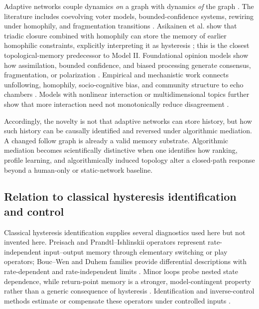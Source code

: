 \documentclass[10pt,a4paper]{article}
\begin{document}
Adaptive networks couple dynamics \emph{on} a graph with dynamics \emph{of} the graph \cite{gross2008adaptive}. The literature includes coevolving voter models, bounded-confidence systems, rewiring under homophily, and fragmentation transitions \cite{holme2006nonequilibrium,kozma2008consensus,gil2006coevolution,vazquez2008adaptive,kan2023adaptive,li2025adaptive}. Asikainen et al. show that triadic closure combined with homophily can store the memory of earlier homophilic constraints, explicitly interpreting it as hysteresis \cite{asikainen2020cumulative}; this is the closest topological-memory predecessor to Model II. Foundational opinion models show how assimilation, bounded confidence, and biased processing generate consensus, fragmentation, or polarization \cite{deffuant2000mixing,castellano2009statistical,dandekar2013assimilation}. Empirical and mechanistic work connects unfollowing, homophily, socio-cognitive bias, and community structure to echo chambers \cite{sasahara2021unfollowing,wang2020public,cinelli2021echo}. Models with nonlinear interaction or multidimensional topics further show that more interaction need not monotonically reduce disagreement \cite{baumann2020echo,baumann2021topics,thurner2025interactions}.

Accordingly, the novelty is not that adaptive networks can store history, but how such history can be causally identified and reversed under algorithmic mediation. A changed follow graph is already a valid memory substrate. Algorithmic mediation becomes scientifically distinctive when one identifies how ranking, profile learning, and algorithmically induced topology alter a closed-path response beyond a human-only or static-network baseline.

\subsection{Relation to classical hysteresis identification and control}

Classical hysteresis identification supplies several diagnostics used here but not invented here. Preisach and Prandtl--Ishlinskii operators represent rate-independent input--output memory through elementary switching or play operators; Bouc--Wen and Duhem families provide differential descriptions with rate-dependent and rate-independent limits \cite{preisach1935magnetic,macki1993mathematical,hassani2014survey,oh2005duhem}. Minor loops probe nested state dependence, while return-point memory is a stronger, model-contingent property rather than a generic consequence of hysteresis \cite{sethna1993hierarchies,mungan2019returnpoint}. Identification and inverse-control methods estimate or compensate these operators under controlled inputs \cite{krejci2001inverse,ikhouane2007systems}.
\end{document}
